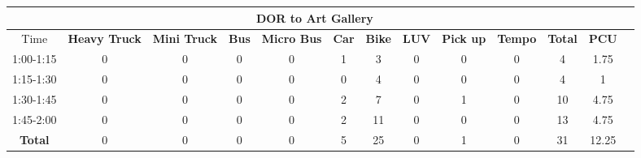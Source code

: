 \begin{landscape}
\begin{table}[h!]
\begin{tabular}{|c|c|c|c|c|c|c|c|c|c|c|c|c|}
    \hline
    \multicolumn{12}{|c|}{\textbf{DOR to Art Gallery}} \\
    \hline
        Time & \textbf{Heavy Truck} & \textbf{Mini Truck} & \textbf{Bus} & \textbf{Micro Bus} & \textbf{Car} & \textbf{Bike} & \textbf{LUV} & \textbf{Pick up} & \textbf{Tempo} & \textbf{\textbf{Total}} & \textbf{PCU} \\
    \hline
1:00-1:15	&0	&0	&0	&0	&1	&3	&0	&0	&0	&4	&1.75 \\ \hline
1:15-1:30	&0	&0	&0	&0	&0	&4	&0	&0	&0	&4	&1 \\ \hline
1:30-1:45	&0	&0	&0	&0	&2	&7	&0	&1	&0	&10	&4.75 \\ \hline
1:45-2:00	&0	&0	&0	&0	&2	&11	&0	&0	&0	&13	&4.75 \\ \hline
\textbf{Total}	&0	&0	&0	&0	&5	&25 &0	&1	&0 &31	&12.25 \\ \hline


\end{tabular}

\end{table}
\end{landscape}


